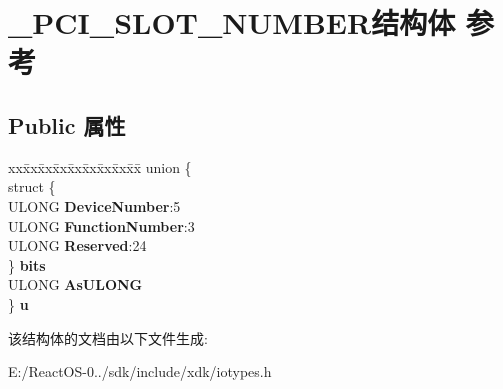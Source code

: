 \hypertarget{struct___p_c_i___s_l_o_t___n_u_m_b_e_r}{}\section{\+\_\+\+P\+C\+I\+\_\+\+S\+L\+O\+T\+\_\+\+N\+U\+M\+B\+E\+R结构体 参考}
\label{struct___p_c_i___s_l_o_t___n_u_m_b_e_r}
\subsection*{Public 属性}
\begin{DoxyCompactItemize}
\item 
\mbox{\label{struct___p_c_i___s_l_o_t___n_u_m_b_e_r_a6f289ec7f9519ed5f2df4e7e7ba2a1e7}} 
\begin{tabbing}
xx\=xx\=xx\=xx\=xx\=xx\=xx\=xx\=xx\=\kill
union \{\\
\>struct \{\\
\>\>ULONG {\bfseries DeviceNumber}:5\\
\>\>ULONG {\bfseries FunctionNumber}:3\\
\>\>ULONG {\bfseries Reserved}:24\\
\>\} {\bfseries bits}\\
\>ULONG {\bfseries AsULONG}\\
\} {\bfseries u}\\

\end{tabbing}\end{DoxyCompactItemize}


该结构体的文档由以下文件生成\+:\begin{DoxyCompactItemize}
\item 
E\+:/\+React\+O\+S-\/0../sdk/include/xdk/iotypes.\+h\end{DoxyCompactItemize}
